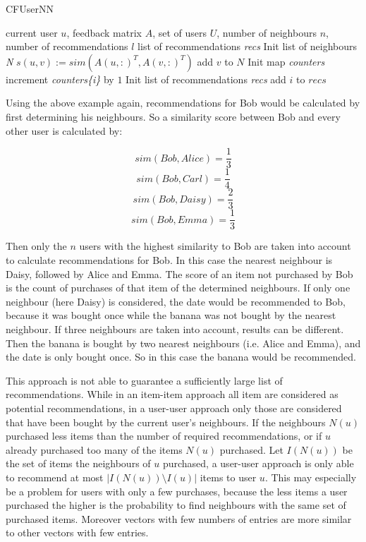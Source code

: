 \documentclass[10pt]{reportMaster}
\begin{document}
\begin{algorithm}
	\caption{CFUserNN}
	\label{alg:CFUserNN}
	\begin{algorithmic}[1]
		\Require current user $u$, feedback matrix $A$, set of users $U$, number of neighbours $n$, number of recommendations $l$
		\Ensure list of recommendations \textit{recs}
		\State Init list of neighbours \textit{N}
			\State $s(u,v) := sim(A(u,:)^T, A(v,:)^T)$
				\State add $v$ to $N$
			\EndIf
		\EndFor
		\State Init map \textit{counters}
				\State increment \textit{counters\{i\}} by $1$
			\EndFor
		\EndFor
		\State Init list of recommendations \textit{recs}
			\State add $i$ to $recs$
			\EndIf
		\EndFor
	\end{algorithmic}	
\end{algorithm}

Using the above example again, recommendations for Bob would be calculated by first determining his neighbours.
So a similarity score between Bob and every other user is calculated by: 

$$sim(Bob, Alice) = \frac{1}{3}$$
$$sim(Bob, Carl) = \frac{1}{4}$$
$$sim(Bob, Daisy) = \frac{2}{3}$$
$$sim(Bob, Emma) = \frac{1}{3}$$

Then only the $n$ users with the highest similarity to Bob are taken into account to calculate recommendations for Bob.
In this case the nearest neighbour is Daisy, followed by Alice and Emma.
The score of an item not purchased by Bob is the count of purchases of that item of the determined neighbours.
If only one neighbour (here Daisy) is considered, the date would be recommended to Bob, because it was bought once while the banana was not bought by the nearest neighbour.
If three neighbours are taken into account, results can be different.
Then the banana is bought by two nearest neighbours (i.e. Alice and Emma), and the date is only bought once.
So in this case the banana would be recommended.

This approach is not able to guarantee a sufficiently large list of recommendations.
While in an item-item approach all item are considered as potential recommendations, in a user-user approach only those are considered that have been bought by the current user's neighbours.
If the neighbours $N(u)$ purchased less items than the number of required recommendations, or if $u$ already purchased too many of the items $N(u)$ purchased.
Let $I(N(u))$ be the set of items the neighbours of $u$ purchased, a user-user approach is only able to recommend at most $|I(N(u)) \setminus I(u)|$ items to user $u$.
This may especially be a problem for users with only a few purchases, because the less items a user purchased the higher is the probability to find neighbours with the same set of purchased items.
Moreover vectors with few numbers of entries are more similar to other vectors with few entries.
\end{document}
